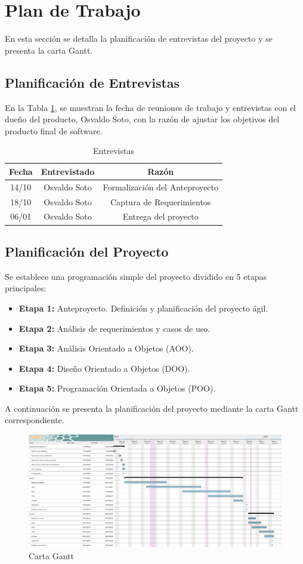 \section{Plan de Trabajo}
En esta sección se detalla la planificación de entrevistas del proyecto y se presenta la carta Gantt.
\subsection{Planificación de Entrevistas}
En la Tabla \ref{table:4}, se muestran la fecha de reuniones de trabajo y entrevistas con el dueño del producto, Osvaldo Soto, con la razón de ajustar los objetivos del producto final de software.
\begin{table}[H]
    \centering
    \caption{Entrevistas}
    \begin{tabular}{|c|c|c|} \hline
        \textbf{Fecha} & \textbf{Entrevistado} & \textbf{Raz\'on} \\ \hline
         14/10 & Osvaldo Soto & Formalización del Anteproyecto\\\hline
         18/10 & Osvaldo Soto & Captura de Requerimientos\\\hline
         06/01 & Osvaldo Soto & Entrega del proyecto\\\hline
    \end{tabular}
    
    \label{table:4}
\end{table}
\subsection{Planificación del Proyecto}
Se establece una programación simple del proyecto dividido en 5 etapas principales:
\begin{itemize}
	\item \textbf{Etapa 1:} Anteproyecto. Definición y planificación del proyecto ágil.
	\item \textbf{Etapa 2:} Análisis de requerimientos y casos de uso.
	\item \textbf{Etapa 3:} Análisis Orientado a Objetos (AOO).
	\item \textbf{Etapa 4:} Diseño Orientado a Objetos (DOO).
	\item \textbf{Etapa 5:} Programación Orientada a Objetos (POO).
\end{itemize}
%
A continuación se presenta la planificación del proyecto mediante la carta Gantt correspondiente.
%
\begin{figure}[h]
	\centering
	\includegraphics[width=\textwidth]{img/CartaGantt.png}
	\caption{Carta Gantt}
	\label{fig:CartaGantt}
\end{figure}
\clearpage
